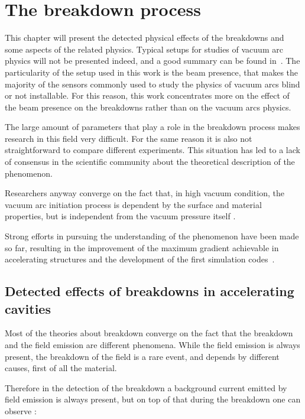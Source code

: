 \chapter[The breakdown process]{The breakdown process}
\label{chap:BDs}

This chapter will present the detected physical effects of the breakdowns and some aspects of the related physics. Typical setups for studies of vacuum arc physics will not be presented indeed, and a good summary can be found in~\cite{Kovermann:1330346}. The particularity of the setup used in this work is the beam presence, that makes the majority of the sensors commonly used to study the physics of vacuum arcs blind or not installable. For this reason, this work concentrates more on the effect of the beam presence on the breakdowns rather than on the vacuum arcs physics. 

The large amount of parameters that play a role in the breakdown process makes research in this field very difficult. For the same reason it is also not straightforward to compare different experiments. This situation has led to a lack of consensus in the scientific community about the theoretical description of the phenomenon.

Researchers anyway converge on the fact that, in high vacuum condition, the vacuum arc initiation process is dependent by the surface and material properties, but is independent from the vacuum pressure itself \cite{alpert:triggers}.

Strong efforts in pursuing the understanding of the phenomenon have been made so far, resulting in the improvement of the maximum gradient achievable in accelerating structures and the development of the first simulation codes~\cite{Insepov:1373092}.



\section[Detected effects of breakdowns in accelerating cavities]{Detected effects of breakdowns in accelerating cavities}

Most of the theories about breakdown converge on the fact that the breakdown and the field emission are different phenomena. While the field emission is always present, the breakdown of the field is a rare event, and depends by different causes, first of all the material.

Therefore in the detection of the breakdown a background current emitted by field emission is always present, but on top of that during the breakdown one can observe \cite{Wuensch:583549}:

